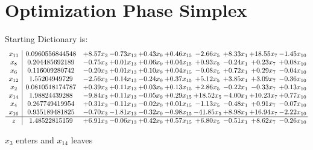 \documentclass[9pt]{article}
\begin{document}
\section{Optimization Phase Simplex}
Starting Dictionary is:
\[\begin{array}{c| c c@{\hskip 2pt} c@{\hskip 2pt} c@{\hskip 2pt} c@{\hskip 2pt} c@{\hskip 2pt} c@{\hskip 2pt} c@{\hskip 2pt} c@{\hskip 2pt} }
 x_{11}   &  0.0960556844548 & +  8.57 x_{3} & -0.73 x_{13} & +  0.43 x_{9} & +  0.46 x_{15} & -2.66 x_{5} & +  8.33 x_{1} & + 18.55 x_{7} & -1.45 x_{10}\\
 x_{8}   &  0.204485692189 & -0.75 x_{3} & +  0.01 x_{13} & +  0.06 x_{9} & +  0.04 x_{15} & +  0.93 x_{5} & -0.24 x_{1} & +  0.23 x_{7} & +  0.08 x_{10}\\
 x_{6}   &  0.116009280742 & -0.20 x_{3} & +  0.01 x_{13} & +  0.10 x_{9} & +  0.04 x_{15} & -0.08 x_{5} & +  0.72 x_{1} & +  0.29 x_{7} & -0.04 x_{10}\\
 x_{12}   &  1.55204949729 & -2.56 x_{3} & -0.14 x_{13} & -0.24 x_{9} & +  0.37 x_{15} & +  5.12 x_{5} & +  3.85 x_{1} & +  3.09 x_{7} & -0.36 x_{10}\\
 x_{2}   &  0.0810518174787 & +  0.39 x_{3} & +  0.11 x_{13} & +  0.03 x_{9} & +  0.13 x_{15} & +  2.86 x_{5} & -0.22 x_{1} & -0.33 x_{7} & +  0.13 x_{10}\\
 x_{14}   &  1.98824439288 & -9.84 x_{3} & +  0.11 x_{13} & -0.05 x_{9} & +  0.29 x_{15} & + 18.52 x_{5} & -4.00 x_{1} & + 10.23 x_{7} & +  0.77 x_{10}\\
 x_{4}   &  0.267749419954 & +  0.31 x_{3} & -0.11 x_{13} & -0.02 x_{9} & +  0.01 x_{15} & -1.13 x_{5} & -0.48 x_{1} & +  0.91 x_{7} & -0.07 x_{10}\\
 x_{16}   &  0.935189481825 & -0.70 x_{3} & -1.81 x_{13} & -0.32 x_{9} & -0.98 x_{15} & -41.85 x_{5} & +  8.98 x_{1} & + 16.94 x_{7} & -2.22 x_{10}\\
\hline
z    &  1.48522815159 & +  6.91 x_{3} & -0.06 x_{13} & +  0.42 x_{9} & +  0.57 x_{15} & +  6.80 x_{5} & -0.51 x_{1} & +  8.62 x_{7} & -0.26 x_{10}\\
\end{array}\]


 $ x_{3} $ enters and $ x_{14} $ leaves 
\end{document}

